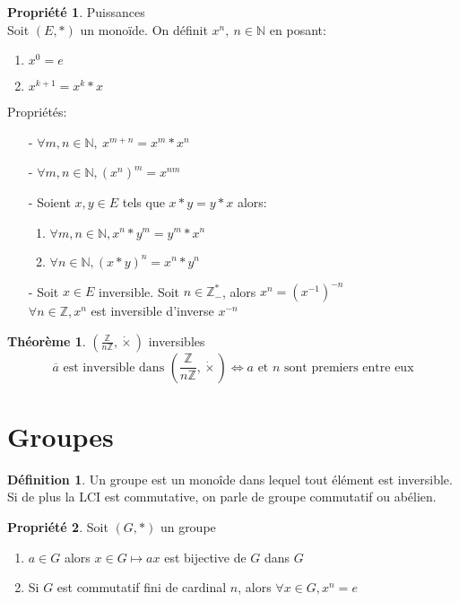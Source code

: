 \documentclass[fleqn]{article}
\theoremstyle{definition} \newtheorem*{defi}{D\'efinition}
\theoremstyle{definition} \newtheorem*{theo}{Th\'eor\`eme}
\theoremstyle{definition} \newtheorem*{coro}{Corollaire}
\theoremstyle{remark} \newtheorem*{rqs}{Remarques}
\theoremstyle{definition} \newtheorem*{prop}{Propri\'et\'e}
\begin{document}
\begin{prop} Puissances \\
Soit $(E, *)$ un mono\"ide. On d\'efinit $x^n,\ n \in \mathbb{N}$ en posant:
	\begin{enumerate}
		\item $x^0 = e$
		\item $x^{k+1} = x^k * x$
	\end{enumerate}
	Propri\'et\'es:
	\begin{itemize}
		\item [-] $\forall m,n \in \mathbb{N},\ x^{m+n} = x^m * x^n$
		\item [-] $\forall m,n \in \mathbb{N}, (x^n)^m = x^{nm}$
		\item [-] Soient $x,y \in E$ tels que $x*y = y*x$ alors:
			\begin{enumerate}
				\item $\forall m,n \in \mathbb{N}, x^n * y^m = y^m * x^n$
				\item $\forall n \in \mathbb{N}, (x*y)^n = x^n * y^n$
			\end{enumerate}
		\item [-] Soit $x \in E$ inversible. Soit $n \in \mathbb{Z}_-^*$, alors $x^n = (x^{-1})^{-n}$\\
			$\forall n \in \mathbb{Z}, x^n$ est inversible d'inverse $x^{-n}$
	\end{itemize}
\end{prop}

\begin{theo} $(\frac{\mathbb{Z}}{n\mathbb{Z}}, \dot\times)$ inversibles
\[\overline{a} \text{ est inversible dans } (\frac{\mathbb{Z}}{n\mathbb{Z}}, \dot\times) \Leftrightarrow a \text{ et } n
	\text{ sont premiers entre eux}\]

\end{theo}

\section{Groupes}
\begin{defi}
	Un groupe est un mono\^ide dans lequel tout \'el\'ement est inversible. Si de plus la LCI est commutative, on parle de groupe commutatif
	ou ab\'elien.
\end{defi}

\begin{prop} Soit $(G, *)$ un groupe
	\begin{enumerate}
		\item $a \in G$ alors $x \in G \mapsto ax$ est bijective de $G$ dans $G$
		\item Si $G$ est commutatif fini de cardinal $n$, alors $\forall x \in G, x^n = e$
	\end{enumerate}
\end{prop}
\end{document}
